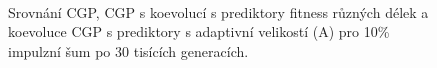 \documentclass[fleqn,11pt]{ExcelAtFIT} %
\begin{document}

\begin{figure}[htb]
    \centering
    \\
    \caption{Srovnání CGP, CGP s koevolucí s prediktory fitness různých délek a koevoluce CGP s prediktory s adaptivní velikostí (A) pro 10\% impulzní šum po 30 tisících generacích.}
    \label{fig:ImpulseBoxplot}
\end{figure}
\end{document}
